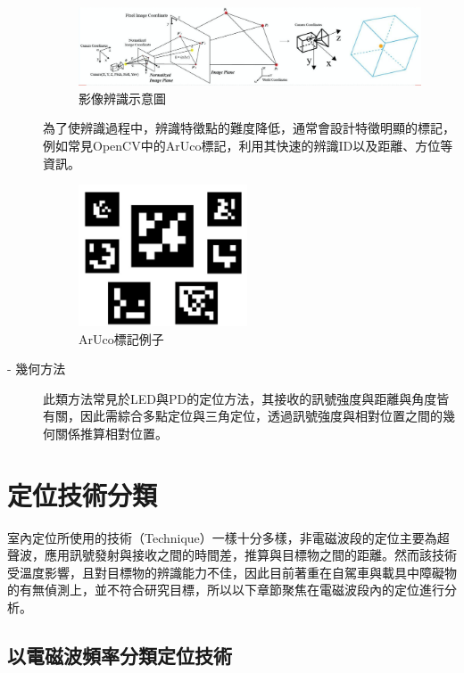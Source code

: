\begin{description}
\begin{figure}[ht]
            \centering
            \includegraphics[width=15cm]{ch2pic/image_processing.png}
            \caption{影像辨識示意圖\cite{pic:image_processing}}
            \label{pic:image_processing}
        \end{figure}
        為了使辨識過程中，辨識特徵點的難度降低，通常會設計特徵明顯的標記，例如常見OpenCV中的ArUco標記，利用其快速的辨識ID以及距離、方位等資訊。
        \begin{figure}[ht]
            \centering
            \includegraphics[width=5cm]{ch2pic/aruco.png}
            \caption{ArUco標記例子\cite{pic:aruco}}
            \label{pic:aruco}
        \end{figure}
        \item[- 幾何方法] 
        此類方法常見於LED與PD的定位方法，其接收的訊號強度與距離與角度皆有關，因此需綜合多點定位與三角定位，透過訊號強度與相對位置之間的幾何關係推算相對位置。
    \end{description}

\section{定位技術分類}
\label{chp:technique}
    室內定位所使用的技術（Technique）一樣十分多樣，非電磁波段的定位主要為超聲波，應用訊號發射與接收之間的時間差，推算與目標物之間的距離。然而該技術受溫度影響，且對目標物的辨識能力不佳，因此目前著重在自駕車與載具中障礙物的有無偵測上\cite{survey_ultrasonic}，並不符合研究目標，所以以下章節聚焦在電磁波段內的定位進行分析。

    

    \subsection{以電磁波頻率分類定位技術}

